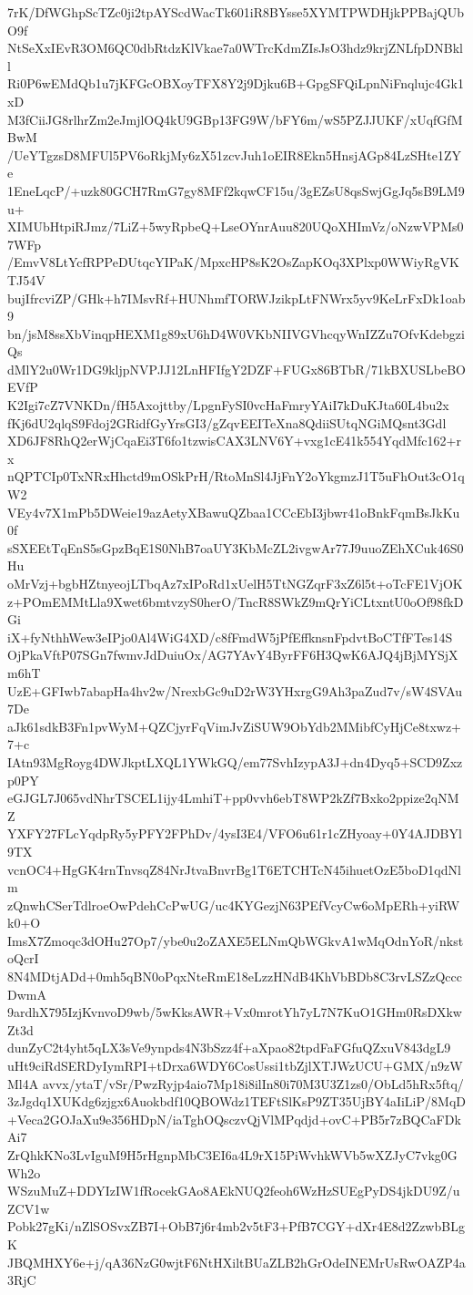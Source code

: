7rK/DfWGhpScTZc0ji2tpAYScdWacTk601iR8BYsse5XYMTPWDHjkPPBajQUbO9f
NtSeXxIEvR3OM6QC0dbRtdzKlVkae7a0WTrcKdmZIsJsO3hdz9krjZNLfpDNBkll
Ri0P6wEMdQb1u7jKFGcOBXoyTFX8Y2j9Djku6B+GpgSFQiLpnNiFnqlujc4Gk1xD
M3fCiiJG8rlhrZm2eJmjlOQ4kU9GBp13FG9W/bFY6m/wS5PZJJUKF/xUqfGfMBwM
/UeYTgzsD8MFUl5PV6oRkjMy6zX51zcvJuh1oEIR8Ekn5HnsjAGp84LzSHte1ZYe
1EneLqcP/+uzk80GCH7RmG7gy8MFf2kqwCF15u/3gEZsU8qsSwjGgJq5sB9LM9u+
XIMUbHtpiRJmz/7LiZ+5wyRpbeQ+LseOYnrAuu820UQoXHImVz/oNzwVPMs07WFp
/EmvV8LtYcfRPPeDUtqcYIPaK/MpxcHP8sK2OsZapKOq3XPlxp0WWiyRgVKTJ54V
bujIfrcviZP/GHk+h7IMsvRf+HUNhmfTORWJzikpLtFNWrx5yv9KeLrFxDk1oab9
bn/jsM8ssXbVinqpHEXM1g89xU6hD4W0VKbNIIVGVhcqyWnIZZu7OfvKdebgziQs
dMlY2u0Wr1DG9kljpNVPJJ12LnHFIfgY2DZF+FUGx86BTbR/71kBXUSLbeBOEVfP
K2Igi7cZ7VNKDn/fH5Axojttby/LpgnFySI0vcHaFmryYAiI7kDuKJta60L4bu2x
fKj6dU2qlqS9Fdoj2GRidfGyYrsGI3/gZqvEEITeXna8QdiiSUtqNGiMQsnt3Gdl
XD6JF8RhQ2erWjCqaEi3T6fo1tzwisCAX3LNV6Y+vxg1cE41k554YqdMfc162+rx
nQPTCIp0TxNRxHhctd9mOSkPrH/RtoMnSl4JjFnY2oYkgmzJ1T5uFhOut3cO1qW2
VEy4v7X1mPb5DWeie19azAetyXBawuQZbaa1CCcEbI3jbwr41oBnkFqmBsJkKu0f
sSXEEtTqEnS5sGpzBqE1S0NhB7oaUY3KbMcZL2ivgwAr77J9uuoZEhXCuk46S0Hu
oMrVzj+bgbHZtnyeojLTbqAz7xIPoRd1xUelH5TtNGZqrF3xZ6l5t+oTcFE1VjOK
z+POmEMMtLla9Xwet6bmtvzyS0herO/TncR8SWkZ9mQrYiCLtxntU0oOf98fkDGi
iX+fyNthhWew3eIPjo0Al4WiG4XD/c8fFmdW5jPfEffknsnFpdvtBoCTfFTes14S
OjPkaVftP07SGn7fwmvJdDuiuOx/AG7YAvY4ByrFF6H3QwK6AJQ4jBjMYSjXm6hT
UzE+GFIwb7abapHa4hv2w/NrexbGc9uD2rW3YHxrgG9Ah3paZud7v/sW4SVAu7De
aJk61sdkB3Fn1pvWyM+QZCjyrFqVimJvZiSUW9ObYdb2MMibfCyHjCe8txwz+7+c
IAtn93MgRoyg4DWJkptLXQL1YWkGQ/em77SvhIzypA3J+dn4Dyq5+SCD9Zxzp0PY
eGJGL7J065vdNhrTSCEL1ijy4LmhiT+pp0vvh6ebT8WP2kZf7Bxko2ppize2qNMZ
YXFY27FLcYqdpRy5yPFY2FPhDv/4ysI3E4/VFO6u61r1cZHyoay+0Y4AJDBYl9TX
vcnOC4+HgGK4rnTnvsqZ84NrJtvaBnvrBg1T6ETCHTcN45ihuetOzE5boD1qdNlm
zQnwhCSerTdlroeOwPdehCcPwUG/uc4KYGezjN63PEfVcyCw6oMpERh+yiRWk0+O
ImsX7Zmoqc3dOHu27Op7/ybe0u2oZAXE5ELNmQbWGkvA1wMqOdnYoR/nkstoQcrI
8N4MDtjADd+0mh5qBN0oPqxNteRmE18eLzzHNdB4KhVbBDb8C3rvLSZzQcccDwmA
9ardhX795IzjKvnvoD9wb/5wKksAWR+Vx0mrotYh7yL7N7KuO1GHm0RsDXkwZt3d
dunZyC2t4yht5qLX3sVe9ynpds4N3bSzz4f+aXpao82tpdFaFGfuQZxuV843dgL9
uHt9ciRdSERDyIymRPI+tDrxa6WDY6CosUssi1tbZjlXTJWzUCU+GMX/n9zWMl4A
avvx/ytaT/vSr/PwzRyjp4aio7Mp18i8ilIn80i70M3U3Z1zs0/ObLd5hRx5ftq/
3zJgdq1XUKdg6zjgx6Auokbdf10QBOWdz1TEFtSlKsP9ZT35UjBY4aIiLiP/8MqD
+Veca2GOJaXu9e356HDpN/iaTghOQsczvQjVlMPqdjd+ovC+PB5r7zBQCaFDkAi7
ZrQhkKNo3LvIguM9H5rHgnpMbC3EI6a4L9rX15PiWvhkWVb5wXZJyC7vkg0GWh2o
WSzuMuZ+DDYIzIW1fRocekGAo8AEkNUQ2feoh6WzHzSUEgPyDS4jkDU9Z/uZCV1w
Pobk27gKi/nZlSOSvxZB7I+ObB7j6r4mb2v5tF3+PfB7CGY+dXr4E8d2ZzwbBLgK
JBQMHXY6e+j/qA36NzG0wjtF6NtHXiltBUaZLB2hGrOdeINEMrUsRwOAZP4a3RjC
